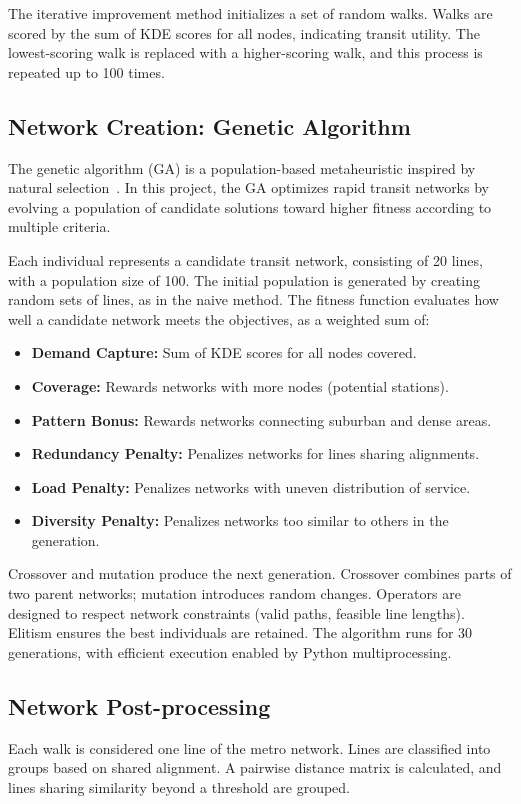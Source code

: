 \documentclass[manuscript]{acmart}
\begin{document}
The iterative improvement method initializes a set of random walks. Walks are scored by the sum of KDE scores for all nodes, indicating transit utility. The lowest-scoring walk is replaced with a higher-scoring walk, and this process is repeated up to 100 times.

\subsection{Network Creation: Genetic Algorithm}
The genetic algorithm (GA) is a population-based metaheuristic inspired by natural selection~\cite{bib:chien2001genetic, bib:dib2017ga}. In this project, the GA optimizes rapid transit networks by evolving a population of candidate solutions toward higher fitness according to multiple criteria.

Each individual represents a candidate transit network, consisting of 20 lines, with a population size of 100. The initial population is generated by creating random sets of lines, as in the naive method. The fitness function evaluates how well a candidate network meets the objectives, as a weighted sum of:
\begin{itemize}
    \item \textbf{Demand Capture:} Sum of KDE scores for all nodes covered.
    \item \textbf{Coverage:} Rewards networks with more nodes (potential stations).
    \item \textbf{Pattern Bonus:} Rewards networks connecting suburban and dense areas.
    \item \textbf{Redundancy Penalty:} Penalizes networks for lines sharing alignments.
    \item \textbf{Load Penalty:} Penalizes networks with uneven distribution of service.
    \item \textbf{Diversity Penalty:} Penalizes networks too similar to others in the generation.
\end{itemize}

Crossover and mutation produce the next generation. Crossover combines parts of two parent networks; mutation introduces random changes. Operators are designed to respect network constraints (valid paths, feasible line lengths). Elitism ensures the best individuals are retained. The algorithm runs for 30 generations, with efficient execution enabled by Python multiprocessing.

\subsection{Network Post-processing}
Each walk is considered one line of the metro network. Lines are classified into groups based on shared alignment. A pairwise distance matrix is calculated, and lines sharing similarity beyond a threshold are grouped.
\end{document}
